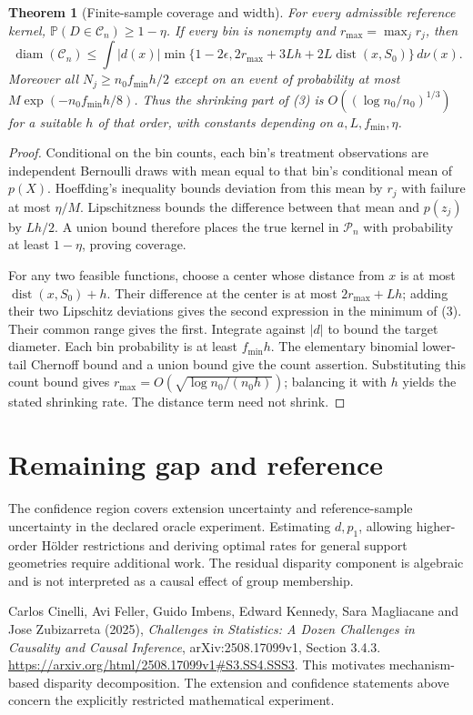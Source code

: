 \documentclass[11pt,a4paper]{article}
\newtheorem{theorem}{Theorem}[section]
\theoremstyle{definition}
\theoremstyle{remark}
\newcommand{\Prob}{\mathbb{P}}
\begin{document}
\begin{theorem}[Finite-sample coverage and width]
For every admissible reference kernel, $\Prob(D\in\mathcal C_n)\geq1-\eta$. If every bin is nonempty and $r_{\max}=\max_jr_j$, then
\[
 \operatorname{diam}(\mathcal C_n)\leq
 \int |d(x)|\min\{1-2\epsilon,
       2r_{\max}+3Lh+2L\operatorname{dist}(x,S_0)\}\,d\nu(x).\tag{3}
\]
Moreover all $N_j\geq n_0f_{\min}h/2$ except on an event of probability at most $M\exp(-n_0f_{\min}h/8)$. Thus the shrinking part of (3) is $O((\log n_0/n_0)^{1/3})$ for a suitable $h$ of that order, with constants depending on $a,L,f_{\min},\eta$.
\end{theorem}
\begin{proof}
Conditional on the bin counts, each bin's treatment observations are independent Bernoulli draws with mean equal to that bin's conditional mean of $p(X)$. Hoeffding's inequality bounds deviation from this mean by $r_j$ with failure at most $\eta/M$. Lipschitzness bounds the difference between that mean and $p(z_j)$ by $Lh/2$. A union bound therefore places the true kernel in $\mathcal P_n$ with probability at least $1-\eta$, proving coverage.

For any two feasible functions, choose a center whose distance from $x$ is at most $\operatorname{dist}(x,S_0)+h$. Their difference at the center is at most $2r_{\max}+Lh$; adding their two Lipschitz deviations gives the second expression in the minimum of (3). Their common range gives the first. Integrate against $|d|$ to bound the target diameter. Each bin probability is at least $f_{\min}h$. The elementary binomial lower-tail Chernoff bound and a union bound give the count assertion. Substituting this count bound gives $r_{\max}=O(\sqrt{\log n_0/(n_0h)})$; balancing it with $h$ yields the stated shrinking rate. The distance term need not shrink.
\end{proof}

\section{Remaining gap and reference}
The confidence region covers extension uncertainty and reference-sample uncertainty in the declared oracle experiment. Estimating $d,p_1$, allowing higher-order H\"older restrictions and deriving optimal rates for general support geometries require additional work. The residual disparity component is algebraic and is not interpreted as a causal effect of group membership.

Carlos Cinelli, Avi Feller, Guido Imbens, Edward Kennedy, Sara Magliacane and Jose Zubizarreta (2025), \emph{Challenges in Statistics: A Dozen Challenges in Causality and Causal Inference}, arXiv:2508.17099v1, Section 3.4.3. \url{https://arxiv.org/html/2508.17099v1#S3.SS4.SSS3}. This motivates mechanism-based disparity decomposition. The extension and confidence statements above concern the explicitly restricted mathematical experiment.
\end{document}
